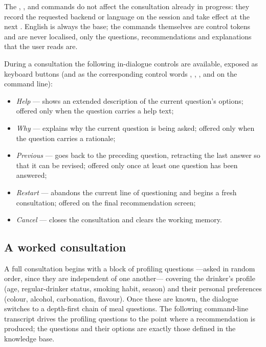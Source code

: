 The , ,  and  commands do not affect
the consultation already in progress: they record the requested backend or
language on the session and take effect at the next . English is
always the base; the commands themselves are control tokens and are never
localised, only the questions, recommendations and explanations that the user
reads are.

During a consultation the following in-dialogue controls are available, exposed
as keyboard buttons (and as the corresponding control words ,
, ,  and  on the command line):

\begin{itemize}
  \item \emph{Help} --- shows an extended description of the current question's
        options; offered only when the question carries a help text;
  \item \emph{Why} --- explains why the current question is being asked; offered
        only when the question carries a rationale;
  \item \emph{Previous} --- goes back to the preceding question, retracting the
        last answer so that it can be revised; offered only once at least one
        question has been answered;
  \item \emph{Restart} --- abandons the current line of questioning and begins a
        fresh consultation; offered on the final recommendation screen;
  \item \emph{Cancel} --- closes the consultation and clears the working memory.
\end{itemize}


\subsection{A worked consultation}

A full consultation begins with a block of profiling questions ---asked in random
order, since they are independent of one another--- covering the drinker's
profile (age, regular-drinker status, smoking habit, season) and their
personal preferences (colour, alcohol, carbonation, flavour). Once these are
known, the dialogue switches to a depth-first chain of meal questions. The
following command-line transcript drives the profiling questions to the point
where a recommendation is produced; the questions and their options are exactly
those defined in the knowledge base.

